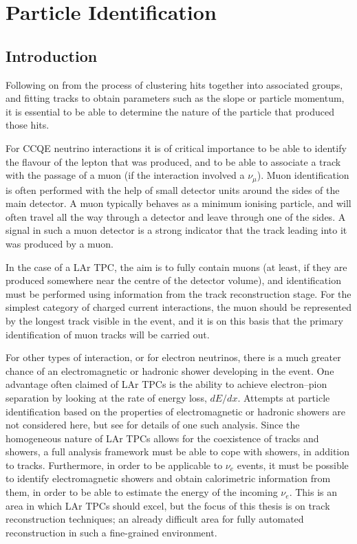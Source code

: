 \chapter{Particle Identification}\label{chapter:PID}

\section{Introduction}
Following on from the process of clustering hits together into associated groups, and fitting tracks to obtain parameters such as the slope or particle momentum, it is essential to be able to determine the nature of the particle that produced those hits.

For \ac{CCQE} neutrino interactions it is of critical importance to be able to identify the flavour of the lepton that was produced, and to be able to associate a track with the passage of a muon (if the interaction involved a $\nu_\mu$). Muon identification is often performed with the help of small detector units around the sides of the main detector. A muon typically behaves as a minimum ionising particle, and will often travel all the way through a detector and leave through one of the sides. A signal in such a muon detector is a strong indicator that the track leading into it was produced by a muon.

In the case of a \ac{LAr TPC}, the aim is to fully contain muons (at least, if they are produced somewhere near the centre of the detector volume), and identification must be performed using information from the track reconstruction stage. For the simplest category of charged current interactions, the muon should be represented by the longest track visible in the event, and it is on this basis that the primary identification of muon tracks will be carried out.

For other types of interaction, or for electron neutrinos, there is a much greater chance of an electromagnetic or hadronic shower developing in the event. One advantage often claimed of LAr TPCs is the ability to achieve electron--pion separation by looking at the rate of energy loss, $dE/dx$. Attempts at particle identification based on the properties of electromagnetic or hadronic showers are not considered here, but see \citep{Ramachers2012} for details of one such analysis. Since the homogeneous nature of LAr TPCs allows for the coexistence of tracks and showers, a full analysis framework must be able to cope with showers, in addition to tracks. Furthermore, in order to be applicable to $\nu_e$ events, it must be possible to identify electromagnetic showers and obtain calorimetric information from them, in order to be able to estimate the energy of the incoming $\nu_e$. This is an area in which LAr TPCs should excel, but the focus of this thesis is on track reconstruction techniques; an already difficult area for fully automated reconstruction in such a fine-grained environment.

